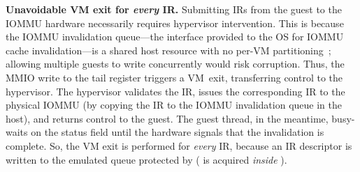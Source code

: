 \noindent
{\bf Unavoidable VM exit for {\em every} IR.} 
Submitting IRs from the guest to the IOMMU hardware necessarily requires hypervisor intervention. 
This is because the IOMMU invalidation queue---the interface provided to the OS for IOMMU cache invalidation---is 
    a shared host resource with no per-VM partitioning~\cite{intel_vtd_spec_caching}; 
    allowing multiple guests to write concurrently would risk corruption. Thus, the MMIO write to the tail register
triggers a 
VM~exit, transferring control to the hypervisor.  The hypervisor validates the IR, issues the corresponding IR to the physical IOMMU (by copying the IR to the IOMMU invalidation queue in the host), and returns control to the guest.  The guest thread, in the meantime, busy-waits on the status field until the hardware signals that the invalidation is complete.  
So, the VM exit is performed for {\em every} IR,
because an IR descriptor is written to the emulated queue protected
    by  ( 
    is acquired \emph{inside} ). 

 





